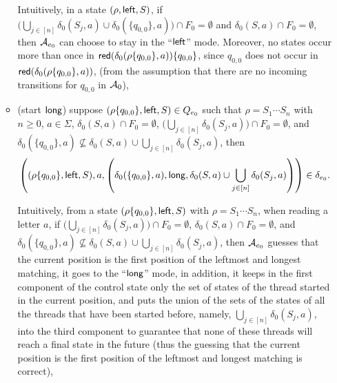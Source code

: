 \begin{itemize}
\begin{itemize}
		\medskip

		Intuitively, in a state $(\rho, \mathsf{left}, S)$, if $\big(\bigcup \limits_{j \in [n]} \delta_0(S_j, a) \cup \delta_0(\{q_{0,0}\},a)\big) \cap F_0 = \emptyset$ and $\delta_0(S,a) \cap F_0 = \emptyset$, then $\mathcal{A}_{e_0}$ can choose to stay in the ``$\mathsf{left}$'' mode.
		Moreover, no states occur more than once in $\mathsf{red}(\delta_0(\rho \{q_{0,0}\}, a)) \{q_{0,0}\}$, since $q_{0,0}$ does not occur in $\mathsf{red}(\delta_0(\rho\{q_{0,0}\}, a))$, (from the assumption that there are no incoming transitions for $q_{0,0}$ in $\mathcal{A}_0$),
		\item (start $\mathsf{long}$) suppose $(\rho \{q_{0,0}\}, \mathsf{left}, S) \in Q_{e_0}$ such that $\rho = S_1 \cdots S_n$ with $n \ge 0$, $a \in \Sigma$, $\delta_0(S,a) \cap F_0 = \emptyset$, $\big(\bigcup \limits_{j \in [n]} \delta_0(S_j, a) \big) \cap F_0 = \emptyset$,  and $\delta_0(\{q_{0,0}\}, a) \not \subseteq \delta_0(S, a) \cup \bigcup \limits_{j \in [n]} \delta_0(S_j, a)$, then
		$$\left((\rho \{q_{0,0}\}, \mathsf{left}, S), a, \left(\delta_0(\{q_{0,0}\}, a), \mathsf{long}, \delta_0(S, a) \cup \bigcup \limits_{j \in [n]} \delta_0(S_j, a) \right) \right) \in \delta_{e_0}.$$

		Intuitively, from a state $(\rho \{q_{0,0}\}, \mathsf{left}, S)$ with $\rho = S_1 \cdots S_n$, when reading a letter $a$, if $\big(\bigcup \limits_{j \in [n]} \delta_0(S_j, a) \big) \cap F_0 = \emptyset$, $\delta_0(S,a) \cap F_0 = \emptyset$, and $\delta_0(\{q_{0,0}\}, a) \not \subseteq \delta_0(S, a) \cup \bigcup \limits_{j \in [n]} \delta_0(S_j, a)$, then $\mathcal{A}_{e_0}$ guesses that the current position is the first position of the leftmost and longest matching, it goes to the ``$\mathsf{long}$'' mode, in addition, it keeps in the first component of the control state only the set of states of the thread started in the current position, and puts the union of the sets of the states of all the threads that have been started before, namely, $\bigcup \limits_{j \in [n]} \delta_0(S_j, a)$, into the third component to guarantee that none of these threads will reach a final state in the future (thus the guessing that the current position is the first position of the leftmost and longest matching is correct),



\end{itemize}
\end{itemize}
